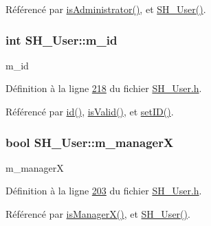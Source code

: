 Référencé par \hyperlink{classSH__User_a2a9cbd9e27e5047ec108d4f373884de5}{is\-Administrator()}, et \hyperlink{classSH__User_a96c0ebb3f11c1654935aaecb92295724}{S\-H\-\_\-\-User()}.

\hypertarget{classSH__User_a701e1d1238c488e46e8d1dcc7dbe8dc0}{
\subsubsection[{m\-\_\-id}]{\setlength{\rightskip}{0pt plus 5cm}int S\-H\-\_\-\-User\-::m\-\_\-id\hspace{0.3cm}{\ttfamily [private]}}}\label{classSH__User_a701e1d1238c488e46e8d1dcc7dbe8dc0}


m\-\_\-id 



Définition à la ligne \hyperlink{SH__User_8h_source_l00218}{218} du fichier \hyperlink{SH__User_8h_source}{S\-H\-\_\-\-User.\-h}.



Référencé par \hyperlink{classSH__User_addf3cb1d491eea2df592dee5c9081d32}{id()}, \hyperlink{classSH__User_a07de5c02b2a02b3bb2b0aaf0886bb4d9}{is\-Valid()}, et \hyperlink{classSH__User_ad3195a7010669a0d007cf95606562eb3}{set\-I\-D()}.

\hypertarget{classSH__User_ab9c9475b85e1449da1476eb7b4157a4d}{
\subsubsection[{m\-\_\-manager\-X}]{\setlength{\rightskip}{0pt plus 5cm}bool S\-H\-\_\-\-User\-::m\-\_\-manager\-X\hspace{0.3cm}{\ttfamily [private]}}}\label{classSH__User_ab9c9475b85e1449da1476eb7b4157a4d}


m\-\_\-manager\-X 



Définition à la ligne \hyperlink{SH__User_8h_source_l00203}{203} du fichier \hyperlink{SH__User_8h_source}{S\-H\-\_\-\-User.\-h}.



Référencé par \hyperlink{classSH__User_af5e5639aa5f7794b5b169f0ed0333268}{is\-Manager\-X()}, et \hyperlink{classSH__User_a96c0ebb3f11c1654935aaecb92295724}{S\-H\-\_\-\-User()}.

